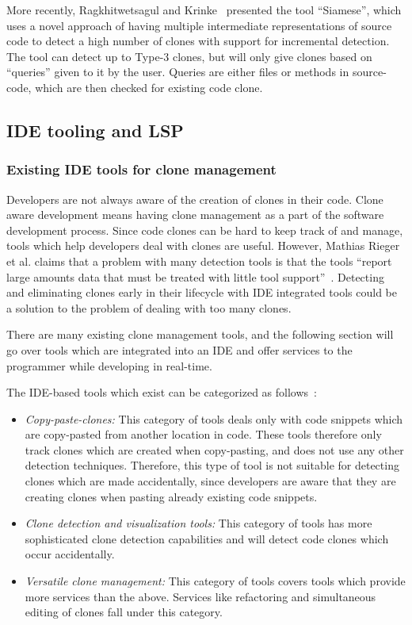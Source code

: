 More recently, Ragkhitwetsagul and Krinke~\cite{SiameseScalableAndIncrementalClone}
presented the tool ``Siamese'', which uses a novel approach of having multiple
intermediate representations of source code to detect a high number of clones with
support for incremental detection. The tool can detect up to Type-3 clones, but will only
give clones based on ``queries'' given to it by the user. Queries are either files or
methods in source-code, which are then checked for existing code clone.

\subsection{IDE tooling and LSP}

\subsubsection{Existing IDE tools for clone management}

Developers are not always aware of the creation of clones in their code. Clone aware
development means having clone management as a part of the software development process.
Since code clones can be hard to keep track of and manage, tools which help developers
deal with clones are useful. However, Mathias Rieger et al. claims that a problem with
many detection tools is that the tools ``report large amounts data that must be treated
with little tool support''~\cite[1]{InsightsSystemWideDuplication}. Detecting and
eliminating clones early in their lifecycle with IDE integrated tools could be a solution
to the problem of dealing with too many clones.

There are many existing clone management tools, and the following section will go over
tools which are integrated into an IDE and offer services to the programmer while
developing in real-time.

The IDE-based tools which exist can be categorized as
follows~\cite[8]{Udding_Towards_Convenient_Management}:

\begin{itemize}
	\item\textit{Copy-paste-clones:} This category of tools deals only with code snippets which are
	copy-pasted from another location in code. These tools therefore only track clones which
	are created when copy-pasting, and does not use any other detection techniques. Therefore,
	this type of tool is not suitable for detecting clones which are made accidentally, since
	developers are aware that they are creating clones when pasting already existing code
	snippets.

	\item\textit{Clone detection and visualization tools:} This category of tools has more
	sophisticated clone detection capabilities and will detect code clones which occur
	accidentally.

	\item\textit{Versatile clone management:} This category of tools covers tools which provide more
	services than the above. Services like refactoring and simultaneous editing of clones fall
	under this category.
\end{itemize}

